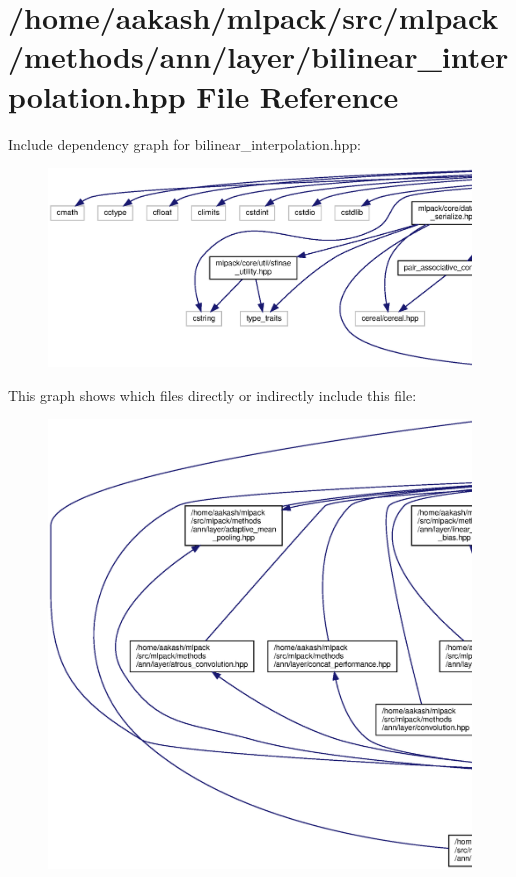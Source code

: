 \section{/home/aakash/mlpack/src/mlpack/methods/ann/layer/bilinear\+\_\+interpolation.hpp File Reference}
\label{bilinear__interpolation_8hpp}
Include dependency graph for bilinear\+\_\+interpolation.\+hpp\+:
\nopagebreak
\begin{figure}[H]
\begin{center}
\leavevmode
\includegraphics[width=350pt]{bilinear__interpolation_8hpp__incl}
\end{center}
\end{figure}
This graph shows which files directly or indirectly include this file\+:
\nopagebreak
\begin{figure}[H]
\begin{center}
\leavevmode
\includegraphics[width=350pt]{bilinear__interpolation_8hpp__dep__incl}
\end{center}
\end{figure}
